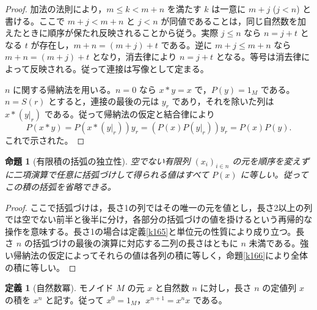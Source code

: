 \documentclass[a5paper,10pt,dvipdfmx]{jsarticle}
\theoremstyle{definition}
\newtheorem{defn}[ruledef]{定義}
\theoremstyle{plain}
\newtheorem{prop}[ruledef]{命題}
\newcommand{\GenronRefText}[2]{#2}
\begin{document}
\begin{proof}
\GenronRefText{K-000108}{加法の法則}により，$m\leq k<m+n$ を満たす $k$ は一意に $m+j$ ($j<n$) と書ける。ここで $m+j<m+n$ と $j<n$ が同値であることは，同じ自然数を加えたときに順序が保たれ反映されることから従う。実際 $j\leq n$ なら $n=j+t$ となる $t$ が存在し，$m+n=(m+j)+t$ である。逆に $m+j\leq m+n$ なら $m+n=(m+j)+t$ となり，消去律により $n=j+t$ となる。等号は消去律によって反映される。従って連接は写像として定まる。

$n$ に関する帰納法を用いる。$n=0$ なら $x*y=x$ で，$P(y)=1_M$ である。$n=S(r)$ とすると，連接の最後の元は $y_r$ であり，それを除いた列は $x*(y|_r)$ である。従って帰納法の仮定と結合律により
\[P(x*y)=P(x*(y|_r))y_r
=(P(x)P(y|_r))y_r=P(x)P(y).\]
これで示された。
\end{proof}
\begin{prop}[有限積の括弧の独立性]\label{k167}
空でない有限列 $(x_i)_{i\in n}$ の元を順序を変えずに二項演算で任意に括弧づけして得られる値はすべて $P(x)$ に等しい。従ってこの積の括弧を省略できる。
\end{prop}
\begin{proof}
ここで括弧づけは，長さ1の列ではその唯一の元を値とし，長さ2以上の列では空でない前半と後半に分け，各部分の括弧づけの値を掛けるという再帰的な操作を意味する。長さ1の場合は定義\ref{k165}と単位元の性質により成り立つ。長さ $n$ の括弧づけの最後の演算に対応する二列の長さはともに $n$ 未満である。強い帰納法の仮定によってそれらの値は各列の積に等しく，命題\ref{k166}により全体の積に等しい。
\end{proof}
\begin{defn}[自然数冪]\label{k168}
モノイド $M$ の元 $x$ と自然数 $n$ に対し，長さ $n$ の定値列 $x$ の積を $x^n$ と記す。従って $x^0=1_M$，$x^{n+1}=x^nx$ である。
\end{defn}
\end{document}
